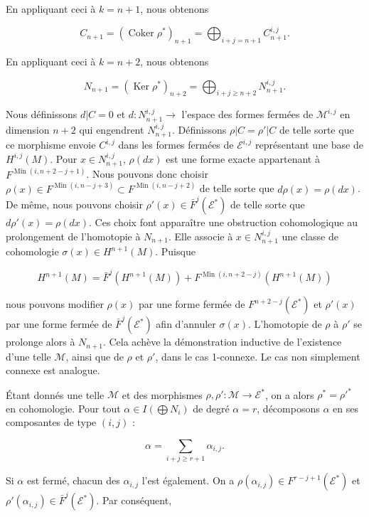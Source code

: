 \documentclass[
  french,
  a3paper,
  a3paper]{extarticle}
\begin{document}
En appliquant ceci à \(k=n+1\), nous obtenons

\[C_{n+1}=(\operatorname{Coker}\rho^*)_{n+1}=\bigoplus_{i+j=n+1}C_{n+1}^{i,j}.\]

En appliquant ceci à \(k=n+2\), nous obtenons

\[N_{n+1}=(\operatorname{Ker}\rho^*)_{n+2}=\bigoplus_{i+j\geq n+2}N_{n+1}^{i,j}.\]

Nous définissons \(d|C=0\) et \(d:N_{n+1}^{i,j}\to\) l'espace des formes
fermées de \(\mathcal{M}^{i,j}\) en dimension \(n+2\) qui engendrent
\(N_{n+1}^{i,j}\). Définissons \(\rho|C=\rho'|C\) de telle sorte que ce
morphisme envoie \(C^{i,j}\) dans les formes fermées de
\(\mathcal{E}^{i,j}\) représentant une base de \(H^{i,j}(M)\). Pour
\(x\in N_{n+1}^{i,j}\), \(\rho(dx)\) est une forme exacte appartenant à
\(F^{\operatorname{Min}(i,n+2-j+1)}\). Nous pouvons donc choisir
\(\rho(x)\in F^{\operatorname{Min}(i,n-j+3)}\subset F^{\operatorname{Min}(i,n-j+2)}\)
de telle sorte que \(d\rho(x)=\rho(dx)\). De même, nous pouvons choisir
\(\rho'(x)\in\bar F^j(\mathcal{E}^*)\) de telle sorte que
\(d\rho'(x)=\rho(dx)\). Ces choix font apparaître une obstruction
cohomologique au prolongement de l'homotopie à \(N_{n+1}\). Elle associe
à \(x\in N_{n+1}^{i,j}\) une classe de cohomologie
\(\sigma(x)\in H^{n+1}(M)\). Puisque

\[H^{n+1}(M)=\bar F^j(H^{n+1}(M))+F^{\operatorname{Min}(i,n+2-j)}(H^{n+1}(M))\]

nous pouvons modifier \(\rho(x)\) par une forme fermée de
\(F^{n+2-j}(\mathcal{E}^*)\) et \(\rho'(x)\) par une forme fermée de
\(\bar F^j(\mathcal{E}^*)\) afin d'annuler \(\sigma(x)\). L'homotopie de
\(\rho\) à \(\rho'\) se prolonge alors à \(N_{n+1}\). Cela achève la
démonstration inductive de l'existence d'une telle \(\mathcal{M}\),
ainsi que de \(\rho\) et \(\rho'\), dans le cas 1-connexe. Le cas non
simplement connexe est analogue.

Étant donnés une telle \(\mathcal{M}\) et des morphismes
\(\rho,\rho':\mathcal{M}\to\mathcal{E}^*\), on a alors
\(\rho^*=\rho'^*\) en cohomologie. Pour tout
\(\alpha\in I(\bigoplus N_i)\) de degré \(\alpha=r\), décomposons
\(\alpha\) en ses composantes de type \((i,j)\) :

\[\alpha=\sum_{i+j\geq r+1}\alpha_{i,j}.\]

Si \(\alpha\) est fermé, chacun des \(\alpha_{i,j}\) l'est également. On
a \(\rho(\alpha_{i,j})\in F^{r-j+1}(\mathcal{E}^*)\) et
\(\rho'(\alpha_{i,j})\in\bar F^j(\mathcal{E}^*)\). Par conséquent,
\end{document}
